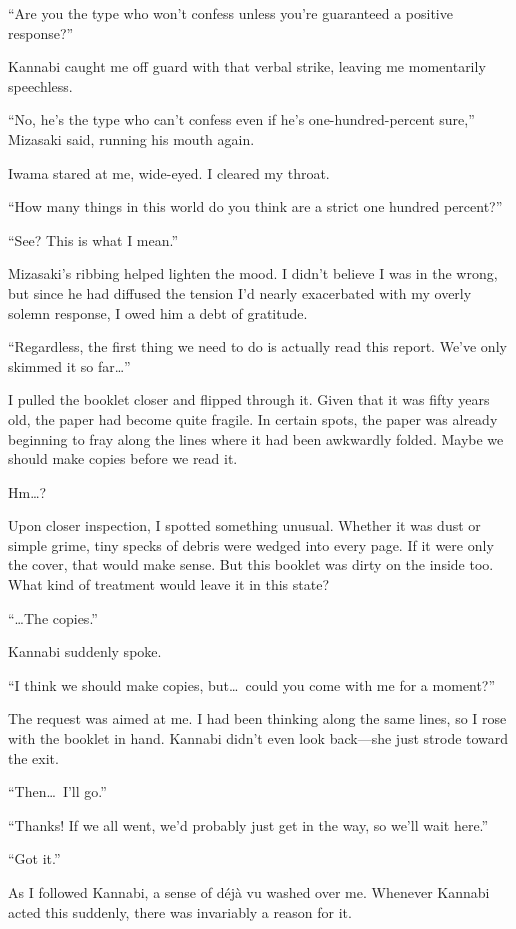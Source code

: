\documentclass[
    a4paper,
    12pt,
    twoside,
    openany,
    UTF8,
    fontset=windows
]{ctexbook}
\begin{document}
``Are you the type who won't confess unless you're guaranteed a positive response?''

Kannabi caught me off guard with that verbal strike, leaving me momentarily speechless.

``No, he's the type who can't confess even if he's one-hundred-percent sure,'' Mizasaki said, running his mouth again.

Iwama stared at me, wide-eyed. I cleared my throat.

``How many things in this world do you think are a strict one hundred percent?''

``See? This is what I mean.''

Mizasaki's ribbing helped lighten the mood. I didn't believe I was in the wrong, but since he had diffused the tension I'd nearly exacerbated with my overly solemn response, I owed him a debt of gratitude.

``Regardless, the first thing we need to do is actually read this report. We've only skimmed it so far\dots''

I pulled the booklet closer and flipped through it. Given that it was fifty years old, the paper had become quite fragile. In certain spots, the paper was already beginning to fray along the lines where it had been awkwardly folded. Maybe we should make copies before we read it.

Hm\dots?

Upon closer inspection, I spotted something unusual. Whether it was dust or simple grime, tiny specks of debris were wedged into every page. If it were only the cover, that would make sense. But this booklet was dirty on the inside too. What kind of treatment would leave it in this state?

``\dots The copies.''

Kannabi suddenly spoke.

``I think we should make copies, but\dots\ could you come with me for a moment?''

The request was aimed at me. I had been thinking along the same lines, so I rose with the booklet in hand. Kannabi didn't even look back---she just strode toward the exit.

``Then\dots\ I'll go.''

``Thanks! If we all went, we'd probably just get in the way, so we'll wait here.''

``Got it.''

As I followed Kannabi, a sense of déjà vu washed over me. Whenever Kannabi acted this suddenly, there was invariably a reason for it.
\end{document}
